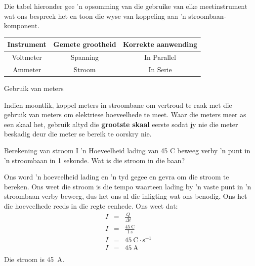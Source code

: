 
Die tabel hieronder gee  'n opsomming van die gebruike van elke meetinstrument
wat ons bespreek het en toon die wyse van koppeling aan 'n
stroombaan-komponent.

\begin{center}
\begin{tabular}{ | c | c | c | }
\hline 
\textbf{Instrument} & \textbf{Gemete grootheid} & \textbf{Korrekte aanwending}
\\ \hline \hline 
Voltmeter & Spanning & In Parallel \\ \hline Ammeter &
Stroom & In Serie \\ \hline
\hline
\end{tabular}
\end{center}


\begin{activity}{Gebruik van meters}

Indien moontlik, koppel meters in stroombane om vertroud te raak met die
gebruik van meters om elektriese hoeveelhede te meet. Waar die meters meer as
een skaal het, gebruik altyd die \textbf{grootste skaal} eerste sodat jy nie
die meter beskadig deur die meter se bereik te oorskry nie.
\end{activity}



\begin{wex}{Berekening van stroom I}
{ 'n Hoeveelheid lading van 45 C beweeg verby  'n punt in  'n stroombaan in 1
sekonde. Wat is die stroom in die baan?
}{%

Ons word  'n hoeveelheid lading en  'n tyd gegee en gevra om die stroom te
bereken. Ons weet die stroom is die tempo waarteen lading by  'n vaste punt in
 'n stroombaan verby beweeg, dus het ons al die inligting wat ons benodig. Ons
het die hoeveelhede reeds in die regte eenhede.
Ons weet dat:
\begin{eqnarray*}
I &=& \frac{Q}{\Delta t} \\
I &=& \frac{45~\text{C}}{1~\text{s}} \\
I &=& 45~\text{C} \cdot \text{s}^{-1} \\
I &=& 45~\text{A} \\
\end{eqnarray*}
Die stroom is 45~A.
}
\end{wex}

